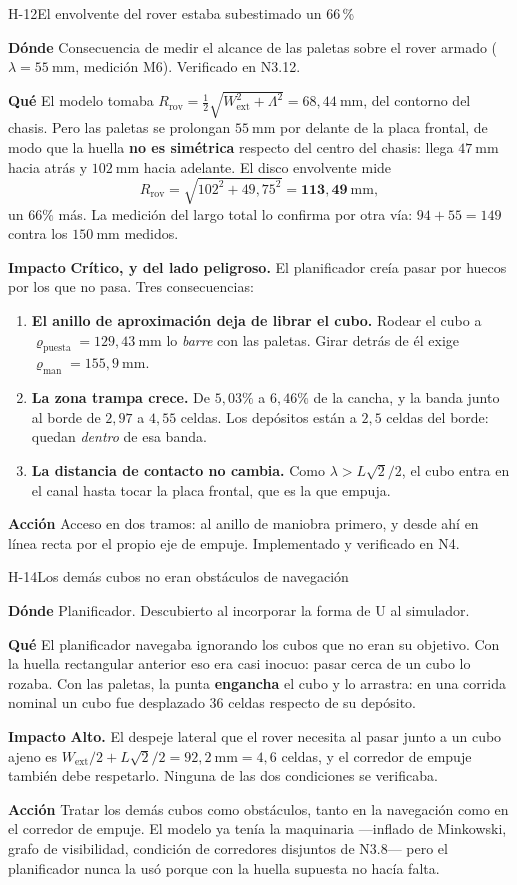 \documentclass[11pt,a4paper]{article}
\newcommand{\campo}[1]{\par\smallskip\noindent\textbf{#1}\quad\ignorespaces}
\begin{document}
\begin{hallazgo}{H-12}{El envolvente del rover estaba subestimado un 66\,\%}
\campo{Dónde} Consecuencia de medir el alcance de las paletas sobre el rover armado
($\lambda = 55\ \mathrm{mm}$, medición M6). Verificado en N3.12.
\campo{Qué} El modelo tomaba $R_{\mathrm{rov}} = \tfrac12\sqrt{W_{\mathrm{ext}}^2+\Lambda^2}
= 68{,}44\ \mathrm{mm}$, del contorno del chasis. Pero las paletas se prolongan
$55\ \mathrm{mm}$ por delante de la placa frontal, de modo que la huella \textbf{no es
simétrica} respecto del centro del chasis: llega $47\ \mathrm{mm}$ hacia atrás y
$102\ \mathrm{mm}$ hacia adelante. El disco envolvente mide
\[
  R_{\mathrm{rov}} = \sqrt{102^2 + 49{,}75^2} = \mathbf{113{,}49\ \mathrm{mm}},
\]
un $66\%$ más. La medición del largo total lo confirma por otra vía: $94 + 55 = 149$
contra los $150\ \mathrm{mm}$ medidos.
\campo{Impacto} \textbf{Crítico, y del lado peligroso.} El planificador creía pasar por
huecos por los que no pasa. Tres consecuencias:
\begin{enumerate}[label=(\alph*),leftmargin=2em,itemsep=1pt,topsep=2pt]
\item \textbf{El anillo de aproximación deja de librar el cubo.} Rodear el cubo a
      $\varrho_{\mathrm{puesta}} = 129{,}43\ \mathrm{mm}$ lo \emph{barre} con las paletas.
      Girar detrás de él exige $\varrho_{\mathrm{man}} = 155{,}9\ \mathrm{mm}$.
\item \textbf{La zona trampa crece.} De $5{,}03\%$ a $6{,}46\%$ de la cancha, y la banda
      junto al borde de $2{,}97$ a $4{,}55$ celdas. Los depósitos están a $2{,}5$ celdas
      del borde: quedan \emph{dentro} de esa banda.
\item \textbf{La distancia de contacto no cambia.} Como $\lambda > L\sqrt2/2$, el cubo
      entra en el canal hasta tocar la placa frontal, que es la que empuja.
\end{enumerate}
\campo{Acción} Acceso en dos tramos: al anillo de maniobra primero, y desde ahí en línea
recta por el propio eje de empuje. Implementado y verificado en N4.
\end{hallazgo}

\begin{hallazgo}{H-14}{Los demás cubos no eran obstáculos de navegación}
\campo{Dónde} Planificador. Descubierto al incorporar la forma de U al simulador.
\campo{Qué} El planificador navegaba ignorando los cubos que no eran su objetivo. Con la
huella rectangular anterior eso era casi inocuo: pasar cerca de un cubo lo rozaba. Con las
paletas, la punta \textbf{engancha} el cubo y lo arrastra: en una corrida nominal un cubo
fue desplazado $36$ celdas respecto de su depósito.
\campo{Impacto} \textbf{Alto.} El despeje lateral que el rover necesita al pasar junto a
un cubo ajeno es $W_{\mathrm{ext}}/2 + L\sqrt2/2 = 92{,}2\ \mathrm{mm} = 4{,}6$ celdas, y
el corredor de empuje también debe respetarlo. Ninguna de las dos condiciones se
verificaba.
\campo{Acción} Tratar los demás cubos como obstáculos, tanto en la navegación como en el
corredor de empuje. El modelo ya tenía la maquinaria ---inflado de Minkowski, grafo de
visibilidad, condición de corredores disjuntos de N3.8--- pero el planificador nunca la
usó porque con la huella supuesta no hacía falta.
\end{hallazgo}
\end{document}
